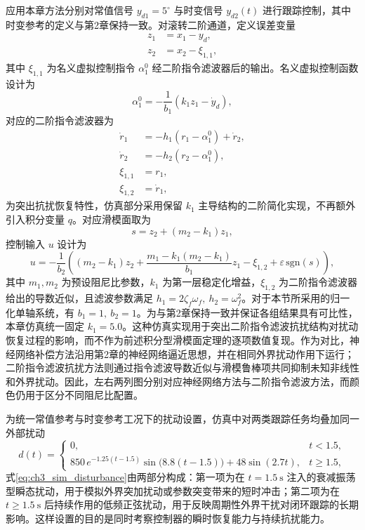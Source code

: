 应用本章方法分别对常值信号 $y_{d1}=5^\circ$ 与时变信号 $y_{d2}(t)$ 进行跟踪控制，其中时变参考的定义与第2章保持一致。对滚转二阶通道，定义误差变量
\begin{subequations}\label{eq:ch3_sim_z}
\begin{align}
z_1&=x_1-y_d,\\
z_2&=x_2-\xi_{1,1},
\end{align}
\end{subequations}
其中 $\xi_{1,1}$ 为名义虚拟控制指令 $\alpha_1^0$ 经二阶指令滤波器后的输出。名义虚拟控制函数设计为
\begin{equation}\label{eq:ch3_sim_alpha1}
\alpha_1^0=-\frac{1}{b_1}\left(k_1z_1-\dot y_d\right),
\end{equation}
对应的二阶指令滤波器为
\begin{subequations}\label{eq:ch3_sim_obs}
\begin{align}
\dot r_1&=-h_1(r_1-\alpha_1^0)+\dot r_2,\\
\dot r_2&=-h_2(r_2-\alpha_1^0),\\
\xi_{1,1}&=r_1,\\
\xi_{1,2}&=\dot r_1,
\end{align}
\end{subequations}
为突出抗扰恢复特性，仿真部分采用保留 $k_1$ 主导结构的二阶简化实现，不再额外引入积分变量 $q$。对应滑模面取为
\begin{equation}\label{eq:ch3_sim_s}
s=z_2+(m_2-k_1)z_1,
\end{equation}
控制输入 $u$ 设计为
\begin{equation}\label{eq:ch3_sim_u}
u=-\frac{1}{b_2}\left((m_2-k_1)z_2+\frac{m_1-k_1(m_2-k_1)}{b_1}z_1-\xi_{1,2}+\varepsilon\,\mathrm{sgn}(s)\right),
\end{equation}
其中 $m_1,m_2$ 为预设阻尼比参数，$k_1$ 为第一层稳定化增益，$\xi_{1,2}$ 为二阶指令滤波器给出的导数近似，且滤波参数满足 $h_1=2\zeta_f\omega_f,\ h_2=\omega_f^2$。对于本节所采用的归一化单轴系统，有 $b_1=1,\ b_2=1$。为与第2章保持一致并保证各组结果具有可比性，本章仿真统一固定 $k_1=5.0$。这种仿真实现用于突出二阶指令滤波抗扰结构对扰动恢复过程的影响，而不作为前述积分型滑模面定理的逐项数值复现。作为对比，神经网络补偿方法沿用第2章的神经网络逼近思想，并在相同外界扰动作用下运行；二阶指令滤波抗扰方法则通过指令滤波导数近似与滑模鲁棒项共同抑制未知非线性和外界扰动。因此，左右两列图分别对应神经网络方法与二阶指令滤波方法，而颜色仍用于区分不同阻尼比配置。

为统一常值参考与时变参考工况下的扰动设置，仿真中对两类跟踪任务均叠加同一外部扰动
\begin{equation}\label{eq:ch3_sim_disturbance}
d(t)=
\begin{cases}
0, & t<1.5,\\
850\,e^{-1.25(t-1.5)}\sin\!\bigl(8.8(t-1.5)\bigr)+48\sin(2.7t), & t\ge 1.5,
\end{cases}
\end{equation}
式\eqref{eq:ch3_sim_disturbance}由两部分构成：第一项为在 $t=1.5\ \mathrm{s}$ 注入的衰减振荡型瞬态扰动，用于模拟外界突加扰动或参数突变带来的短时冲击；第二项为在 $t\ge 1.5\ \mathrm{s}$ 后持续作用的低频正弦扰动，用于反映周期性外界干扰对闭环跟踪的长期影响。这样设置的目的是同时考察控制器的瞬时恢复能力与持续抗扰能力。

